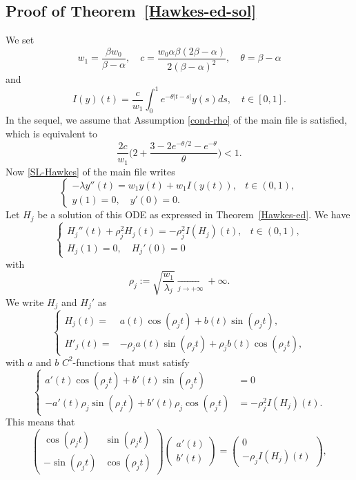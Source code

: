 \documentclass[aos]{imsart}
\theoremstyle{plain}
\theoremstyle{remark}
\newcommand{\1}{1}
\begin{document}
\subsection{Proof of Theorem~\ref{Hawkes-ed-sol}}
We set 
\[w_1=\frac{\beta w_0}{\beta-\alpha},\quad c=\frac{w_0\alpha\beta(2\beta-\alpha)}{2(\beta-\alpha)^2},\quad \theta=\beta-\alpha\]
and
\[
I(y)(t)=\frac{c}{w_1}\int_0^1e^{-\theta |t-s|}y(s)ds,\quad t\in[0,1].
\]
In the sequel, we assume that Assumption \eqref{cond-rho} of the main file is satisfied, which is equivalent to
\begin{equation}\label{cond-constantes1}
 \frac{2c}{w_1}\Big(2+\frac{3-2e^{-\theta/2}-e^{-\theta}}{\theta}\Big)<1.
\end{equation}
Now \eqref{SL-Hawkes} of the main file writes
\[
\left\{
\begin{array}{ll}
\displaystyle -\lambda y''(t)=w_1y(t)+w_1I(y(t)),   &t\in(0,1),\\
y(1)  =0,\quad y'(0)=0.&
\end{array}
\right.
\]
Let $H_j$ be a solution of this ODE as expressed in Theorem~\ref{Hawkes-ed}. We have
\[
\left\{
\begin{array}{ll}
\displaystyle H_j''(t)+\rho_j^2H_j(t)=-\rho_j^2I(H_j)(t),   &t\in(0,1),\\
H_j(1)  =0,\quad H_j'(0)=0&
\end{array}
\right.
\]
with
\begin{equation}\label{rhodef}
\rho_j:=\sqrt{\frac{w_1}{\lambda_j}}\underset{j\to+\infty}{\longrightarrow}+\infty.
\end{equation}
We write $H_j$ and $H_j'$ as %
\[
\left\{
\begin{array}{rc}
H_j(t)=&a(t)\cos (\rho_j t)+b(t)\sin (\rho_j t),\\
H'_j(t)=&-\rho_ja(t)\sin (\rho_j t)+\rho_jb(t)\cos (\rho_j t),
\end{array}
\right.
\]
with $a$ and $b$ $C^2$-functions that must satisfy
\[
\left\{
\begin{array}{rl}
a'(t)\cos (\rho_j t)+b'(t)\sin (\rho_j t)&=0\\
-a'(t)\rho_j\sin (\rho_j t)+b'(t)\rho_j\cos (\rho_j t)&=-\rho_j^2I(H_j)(t).
\end{array}
\right.
\]
This means that
\[
\left(\begin{array}{cc}\cos (\rho_j t) &\sin (\rho_j t) \\-\sin (\rho_j t) & \cos (\rho_j t)\end{array}\right)\left(\begin{array}{c}a'(t) \\ b'(t)\end{array}\right)=\left(\begin{array}{c}0 \\-\rho_jI(H_j)(t)\end{array}\right),
\]
\end{document}
